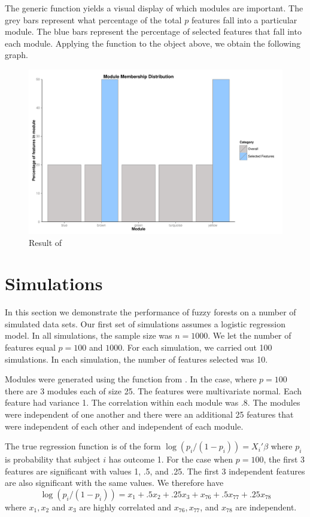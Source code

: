 \documentclass[article,shortnames]{jss}
\begin{document}
The generic function  yields a visual display of which modules are important.  The grey bars
represent what percentage of the total $p$ features fall into a particular module.  The blue bars represent
the percentage of selected features that fall into each module.  Applying the function  to the
object  above, we obtain the following graph.
\begin{figure}[c]
\caption{Result of }
\includegraphics{ch3plot}
\end{figure}
\section{Simulations}
In this section we demonstrate the performance of fuzzy forests on a number of simulated data sets.
Our first set of simulations assumes a logistic regression model.  In all simulations, the sample size
was $n=1000$.  We let the number of features equal $p=100$ and $1000$.
For each simulation, we carried out 100 simulations.  In each simulation, the number of features selected
was 10.    

Modules were generated using the function  from .
In the case, where $p=100$ there are 3 modules each of size 25.  The features were multivariate
normal.  Each feature had variance 1.  The correlation within each module was .8.  The modules were independent of one 
another and there were an additional 25 features that were independent of each other and independent of each module.  

The true regression function is of the form $\log(p_{i}/(1-p_{i}))=X_{i}'\beta$ where $p_{i}$ is probability that
subject $i$ has outcome 1.   For the case when $p=100$,  the first 3 features are significant with values
1, .5, and .25.  The first 3 independent features are also significant with the same values.  We therefore have
\begin{equation}
\log(p_{i}/(1-p_{i})) = x_{1} + .5x_{2} + .25x_{3} + x_{76} + .5x_{77} + .25x_{78}
\end{equation}
where $x_{1}, x_{2}$ and $x_{3}$ are highly correlated and $ x_{76}, x_{77}$, and $x_{78}$ are independent.
\end{document}
